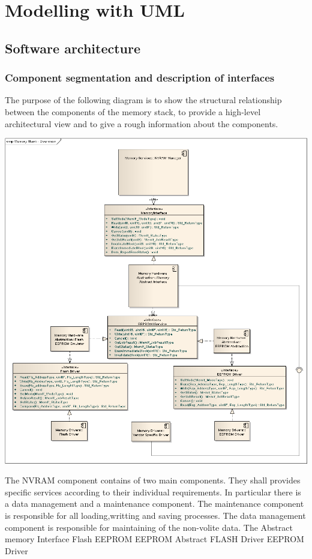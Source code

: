 \section{Modelling with UML}
\subsection{Software architecture}
\subsubsection{Component segmentation and description of interfaces}
The purpose of the following diagram is to show the structural relationship between the components of the memory stack, to provide a high-level architectural view and to give a rough information about the components.\\
\begin{center}
\includegraphics[scale=0.45]{Images/Memory_Stack_Overview_UML.png}
\end{center}
The NVRAM component contains of two main components. They shall provides specific services according to their individual requirements. In particular there is a data management and a maintenance component. The maintenance component is responsible for all loading,writting and saving processes. The data management component is responsible for maintaining  of the non-volite data.
\newline
The Abstract memory Interface
\newline
Flash EEPROM
\newline
EEPROM Abstract
\newline 
FLASH Driver
\newline
EEPROM Driver

